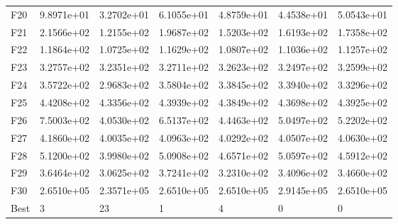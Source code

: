 \begin{tabular}{lllllll}
F20  &  9.8971e+01 &  3.2702e+01 &  6.1055e+01 &  4.8759e+01 &  4.4538e+01 &  5.0543e+01 \\
F21  &  2.1566e+02 &  1.2155e+02 &  1.9687e+02 &  1.5203e+02 &  1.6193e+02 &  1.7358e+02 \\
F22  &  1.1864e+02 &  1.0725e+02 &  1.1629e+02 &  1.0807e+02 &  1.1036e+02 &  1.1257e+02 \\
F23  &  3.2757e+02 &  3.2351e+02 &  3.2711e+02 &  3.2623e+02 &  3.2497e+02 &  3.2599e+02 \\
F24  &  3.5722e+02 &  2.9683e+02 &  3.5804e+02 &  3.3845e+02 &  3.3940e+02 &  3.3296e+02 \\
F25  &  4.4208e+02 &  4.3356e+02 &  4.3939e+02 &  4.3849e+02 &  4.3698e+02 &  4.3925e+02 \\
F26  &  7.5003e+02 &  4.0530e+02 &  6.5137e+02 &  4.4463e+02 &  5.0497e+02 &  5.2202e+02 \\
F27  &  4.1860e+02 &  4.0035e+02 &  4.0963e+02 &  4.0292e+02 &  4.0507e+02 &  4.0630e+02 \\
F28  &  5.1200e+02 &  3.9980e+02 &  5.0908e+02 &  4.6571e+02 &  5.0597e+02 &  4.5912e+02 \\
F29  &  3.6464e+02 &  3.0625e+02 &  3.7241e+02 &  3.2310e+02 &  3.4096e+02 &  3.4660e+02 \\
F30  &  2.6510e+05 &  2.3571e+05 &  2.6510e+05 &  2.6510e+05 &  2.9145e+05 &  2.6510e+05 \\
Best &           3 &          23 &           1 &           4 &           0 &           0 \\
\bottomrule
\end{tabular}

